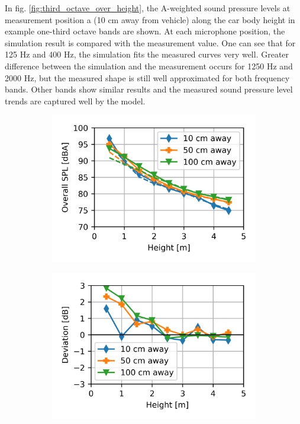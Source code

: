 In fig. \ref{fig:third_octave_over_height}, the A-weighted sound pressure levels at measurement position a (10 cm away from vehicle) along the car body height in example one-third octave bands are shown. At each microphone position, the simulation result is compared with the measurement value. One can see that for 125 Hz and 400 Hz, the simulation fits the measured curves very well. Greater difference between the simulation and the measurement occurs for 1250 Hz and 2000 Hz, but the measured shape is still well approximated for both frequency bands. Other bands show similar results and the measured sound pressure level trends are captured well by the model.

\begin{figure}[H]
	\centering
	\begin{subfigure}[b]{0.49\textwidth}
		\centering
		\includegraphics{fig/chap5/initial_model/overall_SPL/all_pos.png}
	\end{subfigure}
	\begin{subfigure}[b]{0.49\textwidth}
		\centering
		\includegraphics{fig/chap5/initial_model/overall_SPL/deviation.png}

\end{subfigure}
\end{figure}
